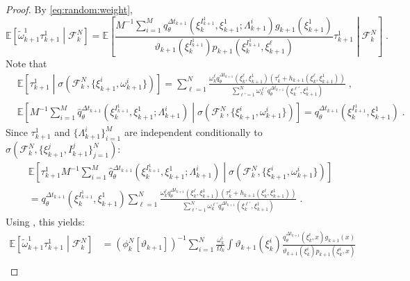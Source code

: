 \documentclass[12pt]{article}
\newcommand{\eqsp}{\;}
\newcommand{\1}{\mathrm{1}}
\begin{document}
\begin{proof}
By \eqref{eq:random:weight},
\[
\mathbb{E}\left[\tilde{\omega}^1_{k+1}\tau^{1}_{k+1}\middle| \mathcal{F}_k^{N}\right] = \mathbb{E}\left[\frac{M^{-1}\sum_{i=1}^M\widehat{q}_{\theta}^{\Delta t_{k+1}}(\xi_{k}^{I^{1}_{k+1}},\xi^{1}_{k+1};\Lambda^i_{k+1})g_{k+1}(\xi^{1}_{k+1})}{\vartheta_{k+1}(\xi^{I^{1}_{k+1}}_{k}) p_{k+1}(\xi_{k}^{I^{1}_{k+1}},\xi^{\ell}_{k+1})}\tau^{1}_{k+1}\middle| \mathcal{F}_k^{N}\right]\eqsp.
\]
Note that
\begin{align*}
&\mathbb{E}\left[\tau^{1}_{k+1}\middle|\sigma\left(\mathcal{F}_k^{N},\{\xi_{k+1}^i,\omega_{k+1}^i\}\right)\right]
 = \sum_{\ell=1}^N\frac{\omega_k^{\ell}q_{\theta}^{\Delta t_{k+1}}(\xi_{k}^{\ell},\xi^{1}_{k+1})\left(\tau^{\ell}_k + h_{k+1}(\xi_{k}^{\ell},\xi^{1}_{k+1})\right)}{\sum_{\ell'=1}^N\omega_k^{\ell'}q_{\theta}^{\Delta t_{k+1}}(\xi_{k}^{\ell'},\xi^{1}_{k+1})}\eqsp,\\
&\mathbb{E}\left[M^{-1}\sum_{i=1}^M\widehat{q}_{\theta}^{\Delta t_{k+1}}(\xi_{k}^{I^{1}_{k+1}},\xi^{1}_{k+1};\Lambda^i_{k+1})\middle|\sigma\left(\mathcal{F}_k^{N},\{\xi_{k+1}^i,\omega_{k+1}^i\}\right)\right]
 = q_{\theta}^{\Delta t_{k+1}}(\xi_{k}^{I^{1}_{k+1}},\xi^{1}_{k+1})\eqsp.
\end{align*}
Since $\tau^{1}_{k+1}$ and $\{\Lambda^i_{k+1}\}_{i=1}^M$ are independent conditionally to $\sigma\left(\mathcal{F}_k^{N},\{\xi_{k+1}^j,I_{k+1}^j\}_{j=1}^N\right)$:
\begin{multline*}
\mathbb{E}\left[\tau^{1}_{k+1}M^{-1}\sum_{i=1}^M\widehat{q}_{\theta}^{\Delta t_{k+1}}(\xi_{k}^{I^{1}_{k+1}},\xi^{1}_{k+1};\Lambda^i_{k+1})\middle|\sigma\left(\mathcal{F}_k^{N},\{\xi_{k+1}^i,\omega_{k+1}^i\}\right)\right]\\
 = q_{\theta}^{\Delta t_{k+1}}(\xi_{k}^{I^{1}_{k+1}},\xi^{1}_{k+1})\sum_{\ell=1}^N\frac{\omega_k^{\ell}q_{\theta}^{\Delta t_{k+1}}(\xi_{k}^{\ell},\xi^{1}_{k+1})\left(\tau^{\ell}_k + h_{k+1}(\xi_{k}^{\ell},\xi^{1}_{k+1})\right)}{\sum_{\ell'=1}^N\omega_k^{\ell'}q_{\theta}^{\Delta t_{k+1}}(\xi_{k}^{\ell'},\xi^{1}_{k+1})}\eqsp.
\end{multline*}
Using , this yields:
\begin{align*}
\mathbb{E}\left[\tilde{\omega}^1_{k+1}\tau^{1}_{k+1}\middle| \mathcal{F}_k^{N}\right]&= \left(\phi^N_{k}[\vartheta_{k+1}]\right)^{-1} \sum_{i=1}^N\frac{\omega_k^i}{\Omega_k}\int\vartheta_{k+1}(\xi^{i}_{k})\frac{q_{\theta}^{\Delta t_{k+1}}(\xi_{k}^{i},x)g_{k+1}(x)}{\vartheta_{k+1}(\xi^{i}_{k}) p_{k+1}(\xi_{k}^{i},x)}\\

\end{align*}
\end{proof}
\end{document}
